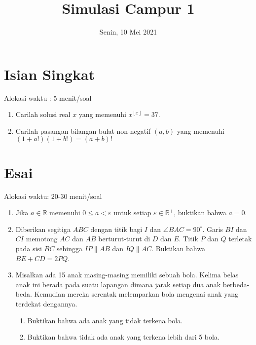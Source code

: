 \documentclass{article}
\title{Simulasi Campur 1}
\date{Senin, 10 Mei 2021}
\begin{document}
	\maketitle
	
\section{Isian Singkat}
Alokasi waktu : 5 menit/soal

\begin{enumerate}
	\item Carilah solusi real $x$ yang memenuhi $x^{\left \lfloor x \right \rfloor} = 37.$
	
	\item Carilah pasangan bilangan bulat non-negatif $(a,b)$ yang memenuhi $(1+a!)(1+b!)=(a+b)!$

\end{enumerate}

\section{Esai}
Alokasi waktu: 20-30 menit/soal
\begin{enumerate}[resume]
	\item Jika $a \in \mathbb{R}$ memenuhi $0 \le a < \varepsilon$ untuk setiap $\varepsilon \in \mathbb{R^+}$, buktikan bahwa $a = 0.$
	
	\item Diberikan segitiga $ABC$ dengan titik bagi $I$ dan $\angle BAC = 90^\circ$. Garis $BI$ dan $CI$ memotong $AC$ dan $AB$ berturut-turut di $D$ dan $E$. Titik $P$ dan $Q$ terletak pada sisi $BC$ sehingga $IP \parallel AB$ dan $IQ \parallel AC$. Buktikan bahwa $BE+CD=2PQ$.
	
	\item Misalkan ada 15 anak masing-masing memiliki sebuah bola. Kelima belas anak ini berada pada suatu lapangan dimana jarak setiap dua anak berbeda-beda. Kemudian mereka serentak melemparkan bola mengenai anak yang terdekat dengannya. 
	\begin{enumerate}
		\item Buktikan bahwa ada anak yang tidak terkena bola.
		\item Buktikan bahwa tidak ada anak yang terkena lebih dari 5 bola.
	\end{enumerate}
	
\end{enumerate}
\end{document}
